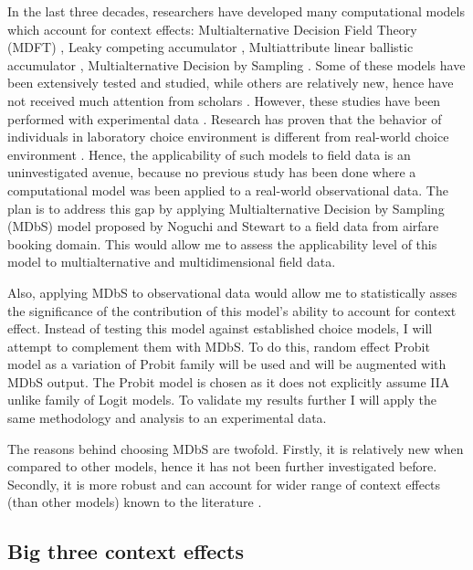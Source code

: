 \documentclass[a4paper,12pt]{article}
\newcommand{\citeyearonly}[1]{\citeyearpar{#1}}
\begin{document}
In the last three decades, researchers have developed many computational models which account for context effects: Multialternative Decision Field Theory (MDFT) \citep{roe2001multialternative}, Leaky competing
accumulator \citep{usher2001time}, Multiattribute linear ballistic accumulator \citep{trueblood2014multiattribute}, Multialternative Decision by Sampling  \citep{noguchi2018multialternative}. Some of these models have been extensively tested and studied, while others are relatively new, hence have not received much attention from scholars \citep{truebloodEtAl13}. However, these studies have been performed with experimental data \citep{trueblood2014multiattribute,  berkowitsch2014rigorously, evans2019response, busemeyer2019cognitive}. Research has proven that the behavior of individuals in laboratory choice environment is different from real-world choice environment \citep{hogarth1989risk}. Hence, the applicability of such models to field data is an uninvestigated avenue, because no previous study has been done where a computational model was been applied to a real-world observational data. The plan is to address this gap by applying Multialternative Decision by Sampling (MDbS) model proposed by Noguchi and Stewart \citeyearonly{noguchi2018multialternative} to a field data from airfare booking domain. This would allow me to assess the applicability level of this model to multialternative and multidimensional field data. 

Also, applying MDbS to observational data would allow me to statistically asses the significance of the contribution of this model's ability to account for context effect. Instead of testing this model against established choice models, I will attempt to complement them with MDbS. To do this, random effect Probit model as a variation of Probit family will be used and will be augmented with MDbS output. The Probit model is chosen as it does not explicitly assume IIA unlike family of Logit models. To validate my results further I will apply the same methodology and analysis to an experimental data.

The reasons behind choosing MDbS are twofold. Firstly, it is relatively new when compared to other models, hence it has not been further investigated before. Secondly, it is more robust and can account for wider range of context effects (than other models) known to the literature \citep{noguchi2018multialternative}.


\subsection{Big three context effects}\label{chapter:bigThreeContextEffectsDescription}
\end{document}
